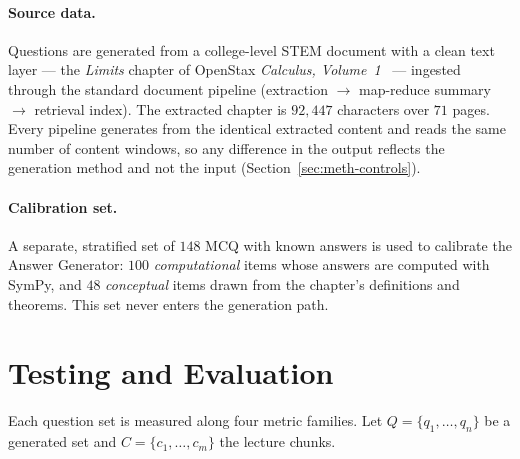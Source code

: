 \paragraph{Source data.} Questions are generated from a college-level STEM document
with a clean text layer --- the \emph{Limits} chapter of OpenStax \emph{Calculus,
Volume~1}~\cite{openstax_calculus} --- ingested through the standard document
pipeline (extraction $\rightarrow$ map-reduce summary $\rightarrow$ retrieval
index). The extracted chapter is $92{,}447$ characters over $71$ pages. Every
pipeline generates from the identical extracted content and reads the same number of
content windows, so any difference in the output reflects the generation method and
not the input (Section~\ref{sec:meth-controls}).

\paragraph{Calibration set.} A separate, stratified set of $148$ MCQ with known
answers is used to calibrate the Answer Generator: $100$ \emph{computational} items
whose answers are computed with SymPy, and $48$ \emph{conceptual} items drawn from
the chapter's definitions and theorems. This set never enters the generation path.

\section{Testing and Evaluation}
\label{sec:res-metrics}

Each question set is measured along four metric families. Let $Q = \{q_1,\dots,q_n\}$
be a generated set and $C = \{c_1,\dots,c_m\}$ the lecture chunks.

